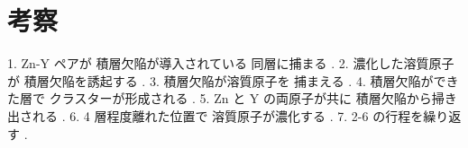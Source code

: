 \chapter{考察}

1. Zn-Y ペアが 積層欠陥が導入されている 同層に捕まる .
2. 濃化した溶質原子が 積層欠陥を誘起する .
3. 積層欠陥が溶質原子を 捕まえる .
4. 積層欠陥ができた層で クラスターが形成される .
5. Zn と Y の両原子が共に 積層欠陥から掃き出される .
6. 4 層程度離れた位置で 溶質原子が濃化する .
7. 2-6 の行程を繰り返す .